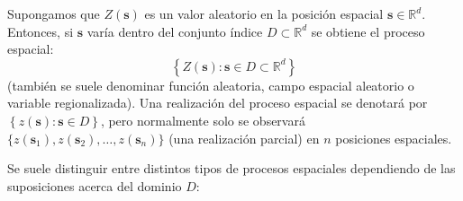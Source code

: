 \documentclass[
  spanish,
]{book}
\theoremstyle{break}
\begin{document}
Supongamos que \(Z(\mathbf{s})\) es un valor aleatorio en la posición espacial \(\mathbf{s} \in \mathbb{R}^{d}\).
Entonces, si \(\mathbf{s}\) varía dentro del conjunto índice \(D\subset \mathbb{R}^{d}\) se obtiene el proceso espacial:
\[\left\{ Z(\mathbf{s}) : \mathbf{s} \in D \subset \mathbb{R}^{d} \right\}\]
(también se suele denominar función aleatoria, campo espacial aleatorio o variable regionalizada).
Una realización del proceso espacial se denotará por \(\left\{ z(\mathbf{s}) : \mathbf{s} \in D \right\}\), pero normalmente solo se observará \(\{z(\mathbf{s}_1), z(\mathbf{s}_2), \ldots, z(\mathbf{s}_n)\}\) (una realización parcial) en \(n\) posiciones espaciales.

Se suele distinguir entre distintos tipos de procesos espaciales dependiendo de las suposiciones acerca del dominio \(D\):
\end{document}
